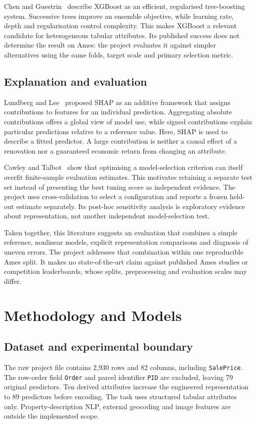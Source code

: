 \documentclass{sigkddExp}
\begin{document}
Chen and Guestrin~\cite{xgboost} describe XGBoost as an efficient, regularised tree-boosting system. Successive trees improve an ensemble objective, while learning rate, depth and regularisation control complexity. This makes XGBoost a relevant candidate for heterogeneous tabular attributes. Its published success does not determine the result on Ames: the project evaluates it against simpler alternatives using the same folds, target scale and primary selection metric.

\subsection{Explanation and evaluation}
Lundberg and Lee~\cite{shap} proposed SHAP as an additive framework that assigns contributions to features for an individual prediction. Aggregating absolute contributions offers a global view of model use, while signed contributions explain particular predictions relative to a reference value. Here, SHAP is used to describe a fitted predictor. A large contribution is neither a causal effect of a renovation nor a guaranteed economic return from changing an attribute.

Cawley and Talbot~\cite{cawley} show that optimising a model-selection criterion can itself overfit finite-sample evaluation estimates. This motivates retaining a separate test set instead of presenting the best tuning score as independent evidence. The project uses cross-validation to select a configuration and reports a frozen held-out estimate separately. Its post-hoc sensitivity analysis is exploratory evidence about representation, not another independent model-selection test.

Taken together, this literature suggests an evaluation that combines a simple reference, nonlinear models, explicit representation comparisons and diagnosis of uneven errors. The project addresses that combination within one reproducible Ames split. It makes no state-of-the-art claim against published Ames studies or competition leaderboards, whose splits, preprocessing and evaluation scales may differ.

\section{Methodology and Models}
\subsection{Dataset and experimental boundary}
The raw project file contains 2,930 rows and 82 columns, including \texttt{SalePrice}. The row-order field \texttt{Order} and parcel identifier \texttt{PID} are excluded, leaving 79 original predictors. Ten derived attributes increase the engineered representation to 89 predictors before encoding. The task uses structured tabular attributes only. Property-description NLP, external geocoding and image features are outside the implemented scope.
\end{document}
